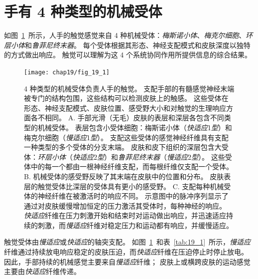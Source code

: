 \section{手有 4 种类型的机械受体}

如图~\ref{fig:19_1}~所示，人手的触觉感觉来自 4 种机械受体：\textit{梅斯诺小体}、\textit{梅克尔细胞}、\textit{环层小体}和\textit{鲁菲尼终末器}。
每个受体根据其形态、神经支配模式和皮肤深度以独特的方式做出响应。
触觉可以理解为这 4 个系统协同作用所提供信息的综合结果。


\begin{figure}[htbp]
	\centering
	\texttt{[image: chap19/fig\_19\_1]}
	\caption{4 种类型的机械受体负责人手的触觉。
		支配手部的有髓感觉神经末端被专门的结构包围，这些结构可以检测皮肤上的触感。
		这些受体在形态、神经支配模式、皮肤位置、感受野大小和对触觉的生理响应方面各不相同\cite{johansson1983tactile}。
		A. 手部光滑（无毛）皮肤的表层和深层各包含不同类型的机械受体。
		表层包含小受体细胞：梅斯诺小体（\textit{快适应}1\textit{型}）和梅克尔细胞（\textit{慢适应}1\textit{型}）。
		支配这些受体的感觉神经纤维具有支配一种类型的多个受体的分支末端。
		皮肤和皮下组织的深层包含大受体：\textit{环层小体}（\textit{快适应}2\textit{型}）和\textit{鲁菲尼终末器}（\textit{慢适应}2\textit{型}）。
		这些受体中的每一个都由一根神经纤维支配，而每根纤维仅支配一个受体。
		B. 机械受体的感受野反映了其末端在皮肤中的位置和分布。
		皮肤表层的触觉受体比深层的受体具有更小的感受野。
		C. 支配每种机械受体的神经纤维在被激活时的响应不同。
		示意图中的脉冲序列显示了通过对皮肤缓慢增加恒定的压力激活其受体时，每种神经的响应。
		\textit{快适应}纤维在压力刺激开始和结束时对运动做出响应，并迅速适应持续的刺激，而\textit{慢适应}纤维对稳定压力和运动都有响应，并缓慢适应。}
	\label{fig:19_1}
\end{figure}


触觉受体由\textit{慢适应}或\textit{快适应}的轴突支配。
如图~\ref{fig:19_1}~和表~\ref{tab:19_1}~所示，\textit{慢适应}纤维通过持续放电响应稳定的皮肤压迫，而\textit{快适应}纤维在压迫停止时停止放电。
因此，手部持续的机械感觉主要来自\textit{慢适应}纤维；
皮肤上或横跨皮肤的运动感觉主要由\textit{快适应}纤维传递。


